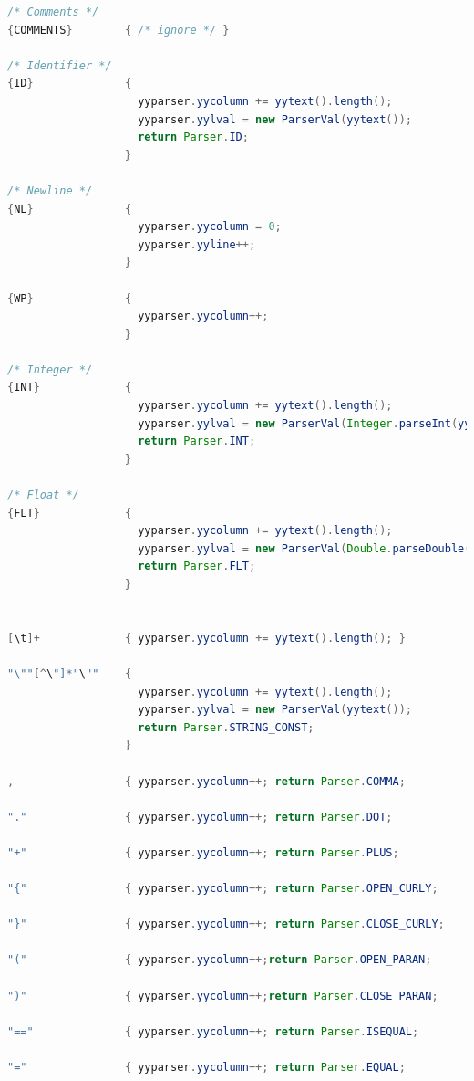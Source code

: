 \documentclass[12pt]{report}
\begin{document}
\begin{singlespace}
\begin{lstlisting}[language=Java,label=some-code,caption={flood$\_$lex.flex}]
/* Comments */
{COMMENTS}        { /* ignore */ }

/* Identifier */
{ID}              {
                    yyparser.yycolumn += yytext().length();
                    yyparser.yylval = new ParserVal(yytext());
                    return Parser.ID;
                  }

/* Newline */
{NL}              {
                    yyparser.yycolumn = 0;
                    yyparser.yyline++;
                  }

{WP}              {
                    yyparser.yycolumn++;
                  }

/* Integer */
{INT}             {
                    yyparser.yycolumn += yytext().length();
                    yyparser.yylval = new ParserVal(Integer.parseInt(yytext()));
                    return Parser.INT;
                  }
                  
/* Float */
{FLT}             {
                    yyparser.yycolumn += yytext().length();
                    yyparser.yylval = new ParserVal(Double.parseDouble(yytext()));
                    return Parser.FLT;
                  }


[\t]+             { yyparser.yycolumn += yytext().length(); }

"\""[^\"]*"\""    {
                    yyparser.yycolumn += yytext().length();
                    yyparser.yylval = new ParserVal(yytext());
                    return Parser.STRING_CONST;   
                  }

,                 { yyparser.yycolumn++; return Parser.COMMA;          }

"."               { yyparser.yycolumn++; return Parser.DOT;            }

"+"               { yyparser.yycolumn++; return Parser.PLUS;           }

"{"               { yyparser.yycolumn++; return Parser.OPEN_CURLY;     }

"}"               { yyparser.yycolumn++; return Parser.CLOSE_CURLY;    }

"("               { yyparser.yycolumn++;return Parser.OPEN_PARAN;      }

")"               { yyparser.yycolumn++;return Parser.CLOSE_PARAN;     }

"=="              { yyparser.yycolumn++; return Parser.ISEQUAL;        }

"="               { yyparser.yycolumn++; return Parser.EQUAL;          }


\end{lstlisting}
\end{singlespace}
\end{document}
